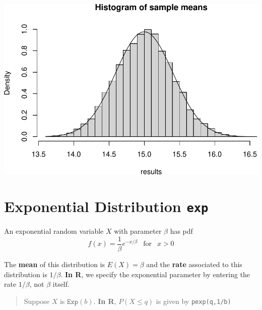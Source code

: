 \documentclass[
]{book}
\theoremstyle{definition}
\theoremstyle{definition}
\theoremstyle{definition}
\theoremstyle{definition}
\theoremstyle{remark}
\begin{document}
\includegraphics{math340-notes_files/figure-latex/unnamed-chunk-174-1.pdf}

\section{\texorpdfstring{Exponential Distribution \texttt{exp}}{Exponential Distribution exp}}\label{expR}

An exponential random variable \(X\) with parameter \(\beta\) has pdf \[f(x) = \frac{1}{\beta}e^{-x/\beta} ~~\text{ for }~~ x > 0\]

The \textbf{mean} of this distribution is \(E(X) = \beta\) and the \textbf{rate} associated to this distribution is \(1/\beta\). \textbf{In R}, we specify the exponential parameter by entering the rate \(1/\beta\), not \(\beta\) itself.

\begin{quote}
Suppose \(X\) is \(\texttt{Exp}(b)\). \textbf{In R}, \(P(X \leq q)\) is given by \texttt{pexp(q,1/b)}
\end{quote}
\end{document}
